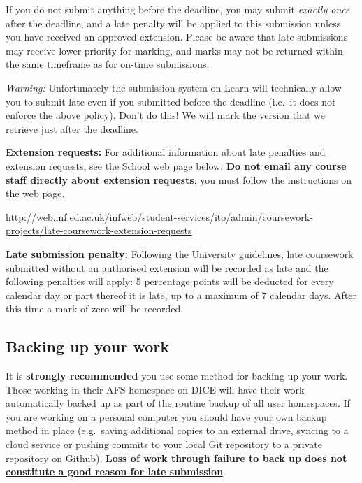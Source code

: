 \documentclass[11pt,]{article}
\begin{document}
If you do not submit anything before the deadline, you may submit {\em
exactly once} after the deadline, and a late penalty will be applied
to this submission unless you have received an approved extension.
Please be aware that late submissions may receive lower priority for
marking, and marks may not be returned within the same timeframe as
for on-time submissions.

{\em Warning:} Unfortunately the submission system on Learn will technically
allow you to submit late even if you submitted before the deadline
(i.e.\ it does not enforce the above policy). Don't do this! We will
mark the version that we retrieve just after the deadline.

\textbf{Extension requests:} 
For additional information about late penalties and extension
requests, see the School web page below. \textbf{Do  not email any course
staff directly about extension requests}; you must follow the
instructions on the web page.

{\small \url{http://web.inf.ed.ac.uk/infweb/student-services/ito/admin/coursework-projects/late-coursework-extension-requests}}

\textbf{Late submission penalty:}  
Following the University guidelines, 
late coursework submitted without an authorised extension will be
recorded as late and the following penalties will apply: 5
percentage points will be deducted for every calendar day or part
thereof it is late, up to a maximum of 7 calendar days. After this
time a mark of zero will be recorded.

\subsection{Backing up your work}
\label{sec:backing-up-your-work}

It is \textbf{strongly recommended} you use some method for backing up
your work. Those working in their AFS homespace on DICE will have their
work automatically backed up as part of the
\href{http://computing.help.inf.ed.ac.uk/backups-and-mirrors}{routine
backup} of all user homespaces. If you are working on a personal
computer you should have your own backup method in place (e.g.~saving
additional copies to an external drive, syncing to a cloud service or
pushing commits to your local Git repository to a private repository on
Github). \textbf{Loss of work through failure to back up
\href{http://web.inf.ed.ac.uk/infweb/student-services/ito/admin/coursework-projects/late-coursework-extension-requests}{does not constitute a good reason for
late submission}}.
\end{document}
